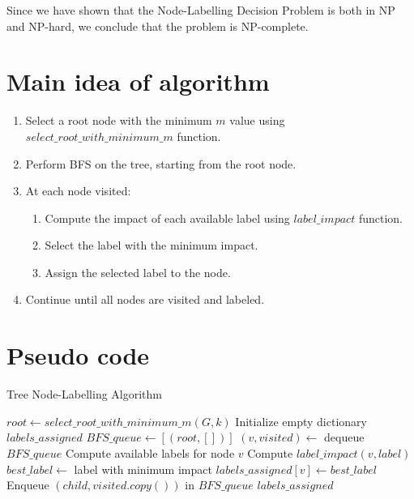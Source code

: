 \documentclass{article}
\begin{document}
Since we have shown that the Node-Labelling Decision Problem is both in NP and NP-hard, we conclude that the problem is NP-complete.

\section{Main idea of algorithm}
\begin{enumerate}
    \item Select a root node with the minimum $m$ value using $select\_root\_with\_minimum\_m$ function.
    \item Perform BFS on the tree, starting from the root node.
    \item At each node visited:
    \begin{enumerate}
        \item Compute the impact of each available label using $label\_impact$ function.
        \item Select the label with the minimum impact.
        \item Assign the selected label to the node.
    \end{enumerate}
    \item Continue until all nodes are visited and labeled.
\end{enumerate}

\section{Pseudo code}
\begin{algorithm}[H]
\caption{Tree Node-Labelling Algorithm}
\begin{algorithmic}[1]
    \State $root \gets select\_root\_with\_minimum\_m(G, k)$
    \State Initialize empty dictionary $labels\_assigned$
    \State $BFS\_queue \gets [(root, [])]$
        \State $(v, visited) \gets$ dequeue $BFS\_queue$
        \State Compute available labels for node $v$
            \State Compute $label\_impact(v, label)$
        \EndFor
        \State $best\_label \gets$ label with minimum impact
        \State $labels\_assigned[v] \gets best\_label$
            \State Enqueue $(child, visited.copy())$ in $BFS\_queue$
        \EndFor
    \EndWhile
    \State \Return $labels\_assigned$
\EndProcedure
\end{algorithmic}
\end{algorithm}
\end{document}
